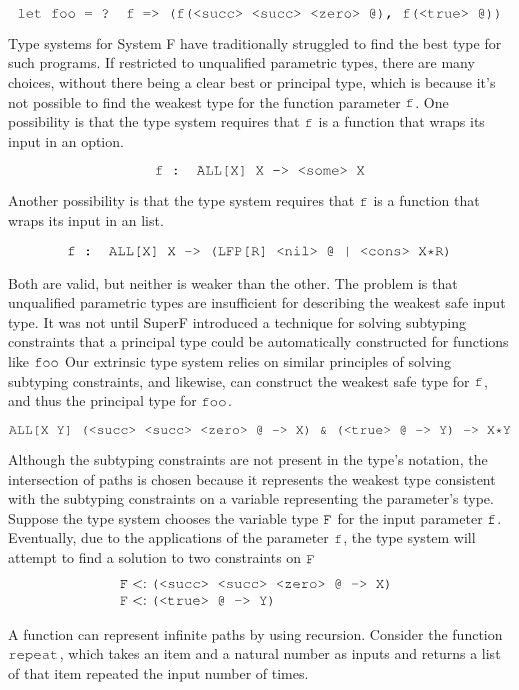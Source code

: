\documentclass[acmsmall]{acmart}
\theoremstyle{definition}
\begin{document}
\[
  \J{let foo = ? f => (f(<succ> <succ> <zero> @), f(<true> @))}
\]

\noindent
Type systems for System F have traditionally struggled to find the best
type for such programs. If restricted to unqualified parametric types, there are many choices,
without there being a clear best or principal type, 
which is because it's not possible to find the weakest type for the function parameter
$\J{f}$.
One possibility is that the type system requires that $\J{f}$ is a function that wraps its
input in an option. 

\[
  \J{f : ALL[X] X -> <some> X}
\]

\noindent
Another possibility is that the type system requires that $\J{f}$ is a function that wraps its
input in an list. 

\[
  \J{f : ALL[X] X -> (LFP[R] <nil> @ | <cons> X*R)}
\]

\noindent
Both are valid, but neither is weaker than the other. The problem is that unqualified parametric
types are insufficient for describing the weakest safe input type.
It was not until SuperF introduced a technique for solving subtyping constraints
that a principal type could be automatically constructed for functions like $\J{foo}$
Our extrinsic type system relies on similar principles of solving subtyping constraints,
and likewise, can construct the weakest safe type for $\J{f}$, and thus the principal type for $\J{foo}$.

\[
  \J{ALL[X Y] (<succ> <succ> <zero> @ -> X) \& (<true> @ -> Y) -> X*Y}
\]

\noindent
Although the subtyping constraints are not present in the type's notation,
the intersection of paths is chosen because it represents the weakest type
consistent with the subtyping constraints on a variable representing the parameter's type. 
Suppose the type system chooses the variable type $\J{F}$ for the input parameter $\J{f}$.
Eventually, due to the applications of the parameter $\J{f}$, the type
system will attempt to find a solution to two constraints on $\J{F}$
\[
  \begin{array}[t]{@{} l}
    \J{F} \subtypes \J{(<succ> <succ> <zero> @ -> X)}
    \\
    \J{F} \subtypes \J{(<true> @ -> Y)}
  \end{array}
\]


A function can represent infinite paths by using recursion.
Consider the function $\J{repeat}$, which takes an item and a natural number
as inputs and returns a list of that item repeated the input number of times.
\end{document}
